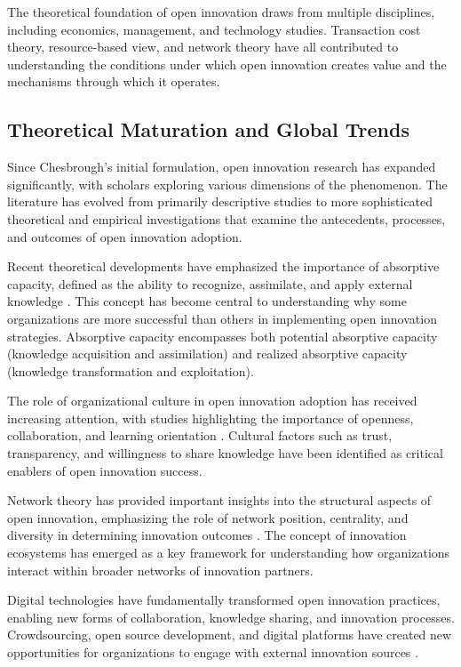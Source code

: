 \documentclass[12pt,a4paper]{article}
\begin{document}
The theoretical foundation of open innovation draws from multiple disciplines, including economics, management, and technology studies. Transaction cost theory, resource-based view, and network theory have all contributed to understanding the conditions under which open innovation creates value and the mechanisms through which it operates.

\subsection{Theoretical Maturation and Global Trends}

Since Chesbrough's initial formulation, open innovation research has expanded significantly, with scholars exploring various dimensions of the phenomenon. The literature has evolved from primarily descriptive studies to more sophisticated theoretical and empirical investigations that examine the antecedents, processes, and outcomes of open innovation adoption.

Recent theoretical developments have emphasized the importance of absorptive capacity, defined as the ability to recognize, assimilate, and apply external knowledge \cite{cohen1990absorptive}. This concept has become central to understanding why some organizations are more successful than others in implementing open innovation strategies. Absorptive capacity encompasses both potential absorptive capacity (knowledge acquisition and assimilation) and realized absorptive capacity (knowledge transformation and exploitation).

The role of organizational culture in open innovation adoption has received increasing attention, with studies highlighting the importance of openness, collaboration, and learning orientation \cite{west2014open}. Cultural factors such as trust, transparency, and willingness to share knowledge have been identified as critical enablers of open innovation success.

Network theory has provided important insights into the structural aspects of open innovation, emphasizing the role of network position, centrality, and diversity in determining innovation outcomes \cite{powell1996interorganizational}. The concept of innovation ecosystems has emerged as a key framework for understanding how organizations interact within broader networks of innovation partners.

Digital technologies have fundamentally transformed open innovation practices, enabling new forms of collaboration, knowledge sharing, and innovation processes. Crowdsourcing, open source development, and digital platforms have created new opportunities for organizations to engage with external innovation sources \cite{afuah2014crowdsourcing}.
\end{document}
